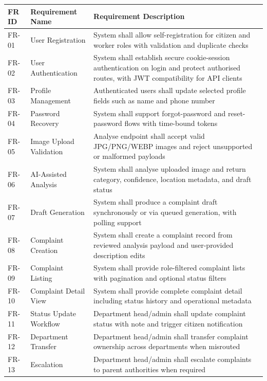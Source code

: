 \begin{xltabular}{\textwidth}{|>{\RaggedRight\arraybackslash}p{0.12\textwidth}|>{\RaggedRight\arraybackslash}p{0.30\textwidth}|>{\RaggedRight\arraybackslash}X|}
\hline
\textbf{FR ID} & \textbf{Requirement Name} & \textbf{Requirement Description} \\ \hline
\endhead
FR-01 & User Registration & System shall allow self-registration for citizen and worker roles with validation and duplicate checks \\ \hline
FR-02 & User Authentication & System shall establish secure cookie-session authentication on login and protect authorised routes, with JWT compatibility for API clients \\ \hline
FR-03 & Profile Management & Authenticated users shall update selected profile fields such as name and phone number \\ \hline
FR-04 & Password Recovery & System shall support forgot-password and reset-password flows with time-bound tokens \\ \hline
FR-05 & Image Upload Validation & Analyse endpoint shall accept valid JPG/PNG/WEBP images and reject unsupported or malformed payloads \\ \hline
FR-06 & AI-Assisted Analysis & System shall analyse uploaded image and return category, confidence, location metadata, and draft status \\ \hline
FR-07 & Draft Generation & System shall produce a complaint draft synchronously or via queued generation, with polling support \\ \hline
FR-08 & Complaint Creation & System shall create a complaint record from reviewed analysis payload and user-provided description edits \\ \hline
FR-09 & Complaint Listing & System shall provide role-filtered complaint lists with pagination and optional status filters \\ \hline
FR-10 & Complaint Detail View & System shall provide complete complaint detail including status history and operational metadata \\ \hline
FR-11 & Status Update Workflow & Department head/admin shall update complaint status with note and trigger citizen notification \\ \hline
FR-12 & Department Transfer & Department head/admin shall transfer complaint ownership across departments when misrouted \\ \hline
FR-13 & Escalation & Department head/admin shall escalate complaints to parent authorities when required \\ \hline

\end{xltabular}
